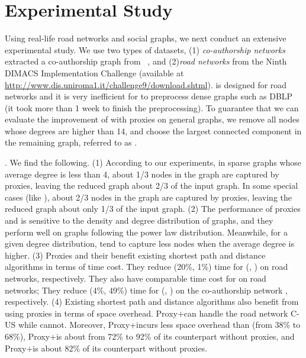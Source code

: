 \section{Experimental Study}
\label{sec-expt}


Using real-life road networks and social graphs, we next conduct an extensive experimental study. 
We use two types of datasets, (1) {\em co-authorship networks} extracted a co-authorship graph from \dblp~\cite{snapnets},
 and (2){\em road networks} from the Ninth DIMACS
Implementation Challenge (available at {\url{http://www.dis.uniroma1.it/challenge9/download.shtml}}).
\tnr is designed for road networks and it is very inefficient for \tnr to preprocess dense graphs such as DBLP (it took more than 1 week to finish the preprocessing). To guarantee that we can evaluate the improvement of \tnr with proxies on general graphs, we remove all nodes whose degrees are higher than 14, and choose the largest connected component in the remaining graph, referred to as \dblpone.

.
We find the following. (1) According to our experiments, in sparse graphs whose average degree is less than 4, about 1/3 nodes in the graph are captured by proxies, leaving the reduced graph about 2/3 of the input graph. In some special cases (like \dblpone), about 2/3 nodes in the graph are captured by proxies, leaving the reduced graph about only 1/3 of the input graph. 
(2) The performance of proxies and \dras is sensitive to the density and degree distribution of graphs, and they perform well on graphs following the power law distribution. Meanwhile, for a given degree distribution, \dras tend to capture less nodes when the average degree is higher. (3) Proxies and their \dras benefit existing shortest path and distance algorithms in terms of time cost. They reduce (20\%, 1\%) time for (\arcflag, \ah) on road networks, respectively. They also have comparable time cost for \tnr on road networks; They reduce (4\%, 49\%) time for (\arcflag, \tnr) on the co-authorship network \dblpone, respectively. (4) Existing shortest path and distance algorithms also benefit from using proxies in terms of space overhead. Proxy+\tnr can handle the road network C-US while \tnr cannot. Moreover, Proxy+\arcflag incurs less space overhead than \arcflag (from 38\% to 68\%), Proxy+\tnr is about from 72\% to 92\% of its counterpart without proxies, and Proxy+\ah is about 82\% of its counterpart without proxies.

